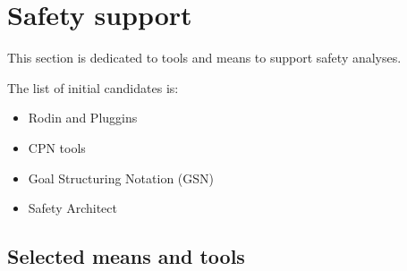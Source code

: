 

\chapter{Safety support}
\label{sec:safety}

This section is dedicated to tools and means to support safety analyses.



The list of initial candidates is:

\begin{itemize}
\item Rodin and Pluggins
\item CPN tools
\item Goal Structuring Notation (GSN)
\item Safety Architect
\end{itemize}

\section{Selected means and tools}

\begin{comment}
To complete after decision meeting with a section for each tool with the following contents:

\begin{itemize}
\item description of the means or tools, references and links
\item added value for openETCS
\item for which tasks and how (input/output/actions) is the mean or tools used.
\end{itemize}
\end{comment}